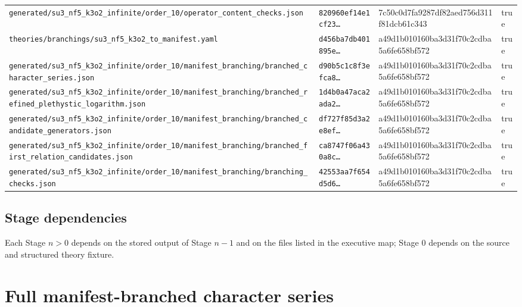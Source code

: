 \documentclass[11pt]{article}
\newcommand{\RawPath}[1]{\texttt{#1}}
\begin{document}
\begin{longtable}{p{5cm}p{3.2cm}p{3.2cm}l}
\RawPath{generated/su3\_nf5\_k3o2\_infinite/order\_10/operator\_content\_checks.json} & \texttt{820960ef14e1cf23\ldots} & 7c50c0d7fa9287df82aed756d311f81dcb61c343 & true\\
\RawPath{theories/branchings/su3\_nf5\_k3o2\_to\_manifest.yaml} & \texttt{d456ba7db401895e\ldots} & a49d1b010160ba3d31f70c2cdba5a6fe658bf572 & true\\
\RawPath{generated/su3\_nf5\_k3o2\_infinite/order\_10/manifest\_branching/branched\_character\_series.json} & \texttt{d90b5c1c8f3efca8\ldots} & a49d1b010160ba3d31f70c2cdba5a6fe658bf572 & true\\
\RawPath{generated/su3\_nf5\_k3o2\_infinite/order\_10/manifest\_branching/branched\_refined\_plethystic\_logarithm.json} & \texttt{1d4b0a47aca2ada2\ldots} & a49d1b010160ba3d31f70c2cdba5a6fe658bf572 & true\\
\RawPath{generated/su3\_nf5\_k3o2\_infinite/order\_10/manifest\_branching/branched\_candidate\_generators.json} & \texttt{df727f85d3a2e8ef\ldots} & a49d1b010160ba3d31f70c2cdba5a6fe658bf572 & true\\
\RawPath{generated/su3\_nf5\_k3o2\_infinite/order\_10/manifest\_branching/branched\_first\_relation\_candidates.json} & \texttt{ca8747f06a430a8c\ldots} & a49d1b010160ba3d31f70c2cdba5a6fe658bf572 & true\\
\RawPath{generated/su3\_nf5\_k3o2\_infinite/order\_10/manifest\_branching/branching\_checks.json} & \texttt{42553aa7f654d5d6\ldots} & a49d1b010160ba3d31f70c2cdba5a6fe658bf572 & true\\
\bottomrule\end{longtable}
\subsection{Stage dependencies}
Each Stage $n>0$ depends on the stored output of Stage $n-1$ and on the files listed in the executive map; Stage 0 depends on the source and structured theory fixture.
\appendix\section{Full manifest-branched character series}
\end{document}
